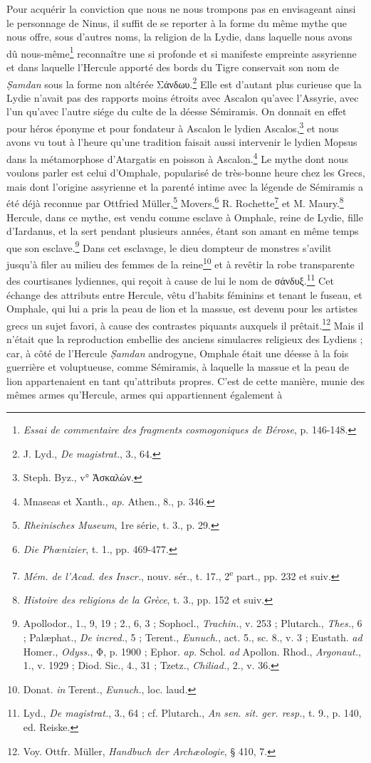 \documentclass[a4paper, 11pt, oneside]{article}
\begin{document}
Pour acquérir la conviction que nous ne nous trompons pas en envisageant ainsi le personnage de Ninus, il suffit de se reporter à la forme du même mythe que nous offre, sous d'autres noms, la religion de la Lydie, dans laquelle nous avons dû nous-même\footnote{\emph{Essai de commentaire des fragments cosmogoniques de Bérose}, p. 146-148.} reconnaître une si profonde et si manifeste empreinte assyrienne et dans laquelle l'Hercule apporté des bords du Tigre conservait son nom de \emph{\d{S}amdan} sous la forme non altérée Σάνδωυ.\footnote{J. Lyd., \emph{De magistrat.}, 3., 64.} Elle est d'autant plus curieuse que la Lydie n'avait pas des rapports moins étroits avec Ascalon qu'avec l'Assyrie, avec l'un qu'avec l'autre siége du culte de la déesse Sémiramis. On donnait en effet pour héros éponyme et pour fondateur à Ascalon le lydien Ascalos,\footnote{Steph. Byz., v° Ἀσκαλών.} et nous avons vu tout à l'heure qu'une tradition faisait aussi intervenir le lydien Mopsus dans la métamorphose d'Atargatis en poisson à Ascalon.\footnote{Mnaseas et Xanth., \emph{ap.} Athen., 8., p. 346.} Le mythe dont nous voulons parler est celui d'Omphale, popularisé de très-bonne heure chez les Grecs, mais dont l'origine assyrienne et la parenté intime avec la légende de Sémiramis a été déjà reconnue par Ottfried Müller,\footnote{\emph{Rheinisches Museum}, 1re série, t. 3., p. 29.} Movers,\footnote{\emph{Die Phœnizier}, t. 1., pp. 469-477.} R. Rochette\footnote{\emph{Mém. de l'Acad. des Inscr.}, nouv. sér., t. 17., 2\textsuperscript{e} part., pp. 232 et suiv.} et M. Maury.\footnote{\emph{Histoire des religions de la Grèce}, t. 3., pp. 152 et suiv.} Hercule, dans ce mythe, est vendu comme esclave à Omphale, reine de Lydie, fille d'Iardanus, et la sert pendant plusieurs années, étant son amant en même temps que son esclave.\footnote{Apollodor., 1., 9, 19 ; 2., 6, 3 ; Sophocl., \emph{Trachin.}, v. 253 ; Plutarch., \emph{Thes.}, 6 ; Palæphat., \emph{De incred.}, 5 ; Terent., \emph{Eunuch.}, act. 5., sc. 8., v. 3 ; Eustath. \emph{ad} Homer., \emph{Odyss.}, Φ, p. 1900 ; Ephor. \emph{ap.} Schol. \emph{ad} Apollon. Rhod., \emph{Argonaut.}, 1., v. 1929 ; Diod. Sic., 4., 31 ; Tzetz., \emph{Chiliad.}, 2., v. 36.} Dans cet esclavage, le dieu dompteur de monstres s'avilit jusqu'à filer au milieu des femmes de la reine\footnote{Donat. \emph{in} Terent., \emph{Eunuch.}, loc. laud.} et à revêtir la robe transparente des courtisanes lydiennes, qui reçoit à cause de lui le nom de σάνδυξ.\footnote{Lyd., \emph{De magistrat.}, 3., 64 ; cf. Plutarch., \emph{An sen. sit. ger. resp.}, t. 9., p. 140, ed. Reiske.} Cet échange des attributs entre Hercule, vêtu d'habits féminins et tenant le fuseau, et Omphale, qui lui a pris la peau de lion et la massue, est devenu pour les artistes grecs un sujet favori, à cause des contrastes piquants auxquels il prêtait.\footnote{Voy. Ottfr. Müller, \emph{Handbuch der Archæologie}, § 410, 7.} Mais il n'était que la reproduction embellie des anciens simulacres religieux des Lydiens ; car, à côté de l'Hercule \emph{\d{S}amdan} androgyne, Omphale était une déesse à la fois guerrière et voluptueuse, comme Sémiramis, à laquelle la massue et la peau de lion appartenaient en tant qu'attributs propres. C'est de cette manière, munie des mêmes armes qu'Hercule, armes qui appartiennent également à 
\end{document}
